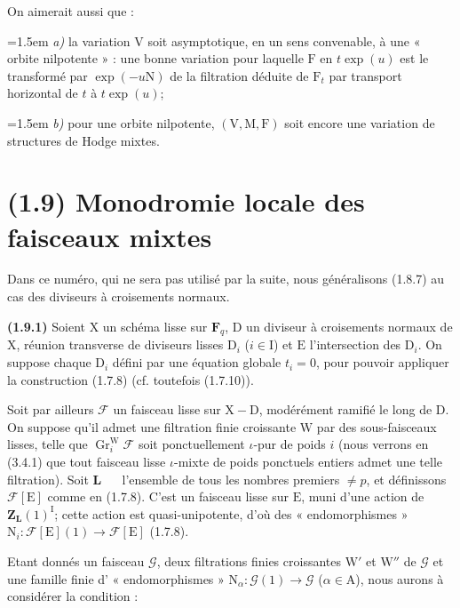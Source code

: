 \documentclass[11pt,leqno]{article}
\newcommand{\Page}[1]{\ifvmode\noindent\else\unskip\ \fi{\footnotesize\textcolor{gray}{[p.\,#1]}}\ \ignorespaces}
\begin{document}
On aimerait aussi que :

\noindent\hangindent=1.5em
\textit{a)} la variation \(\mathrm{V}\) soit asymptotique, en un sens convenable, à une « orbite nilpotente » : une bonne variation pour laquelle \(\mathrm{F}\) en \(t\exp(u)\) est le transformé par \(\exp(-u\mathrm{N})\) de la filtration déduite de \(\mathrm{F}_t\) par transport horizontal de \(t\) à \(t\exp(u)\);

\noindent\hangindent=1.5em
\textit{b)} pour une orbite nilpotente, \((\mathrm{V},\mathrm{M},\mathrm{F})\) soit encore une variation de structures de Hodge mixtes.

\section*{(1.9) Monodromie locale des faisceaux mixtes}

Dans ce numéro, qui ne sera pas utilisé par la suite, nous généralisons (1.8.7) au cas des diviseurs à croisements normaux.

\textbf{(1.9.1)} Soient \(\mathrm{X}\) un schéma lisse sur \(\mathbf{F}_q\), \(\mathrm{D}\) un diviseur à croisements normaux de \(\mathrm{X}\), réunion transverse de diviseurs lisses \(\mathrm{D}_i\) (\(i\in\mathrm{I}\)) et \(\mathrm{E}\) l’intersection des \(\mathrm{D}_i\). On suppose chaque \(\mathrm{D}_i\) défini par une équation globale \(t_i=0\), pour pouvoir appliquer la construction (1.7.8) (cf. toutefois (1.7.10)).

Soit par ailleurs \(\mathscr{F}\) un faisceau lisse sur \(\mathrm{X}-\mathrm{D}\), modérément ramifié le long de \(\mathrm{D}\). On suppose qu’il admet une filtration finie croissante \(\mathrm{W}\) par des sous-faisceaux lisses, telle que \(\operatorname{Gr}_i^{\mathrm{W}}\mathscr{F}\) soit ponctuellement \(\iota\)-pur de poids \(i\) (nous verrons en (3.4.1) que tout faisceau lisse \(\iota\)-mixte de poids ponctuels entiers admet une telle filtration). Soit \(\mathbf{L}\)
\Page{180}
l’ensemble de tous les nombres premiers \(\neq p\), et définissons \(\mathscr{F}[\mathrm{E}]\) comme en (1.7.8). C’est un faisceau lisse sur \(\mathrm{E}\), muni d’une action de \(\mathbf{Z}_{\mathbf{L}}(1)^{\mathrm{I}}\); cette action est quasi-unipotente, d’où des « endomorphismes » \(\mathrm{N}_i:\mathscr{F}[\mathrm{E}](1)\to\mathscr{F}[\mathrm{E}]\) (1.7.8).

Etant donnés un faisceau \(\mathscr{G}\), deux filtrations finies croissantes \(\mathrm{W}'\) et \(\mathrm{W}''\) de \(\mathscr{G}\) et une famille finie d’ « endomorphismes » \(\mathrm{N}_\alpha:\mathscr{G}(1)\to\mathscr{G}\) (\(\alpha\in\mathrm{A}\)), nous aurons à considérer la condition :
\end{document}
